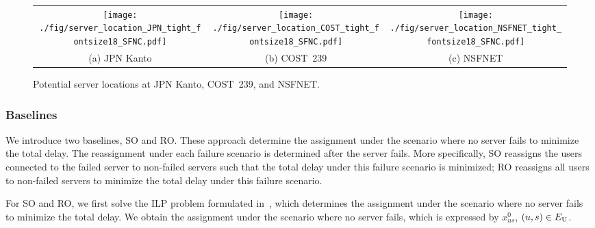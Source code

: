 \documentclass[10pt, letterpaper]{IEEEtran}
\begin{document}
\begin{CJK}{UTF8}{ipxm}
\begin{figure*}[!t]
  \begin{center}
      \begin{tabular}{ccc}
      \texttt{[image: ./fig/server\_location\_JPN\_tight\_fontsize18\_SFNC.pdf]} &
      \texttt{[image: ./fig/server\_location\_COST\_tight\_fontsize18\_SFNC.pdf]} &
      \texttt{[image: ./fig/server\_location\_NSFNET\_tight\_fontsize18\_SFNC.pdf]} \\
      (a) JPN Kanto & (b) COST~239 & (c) NSFNET
      \end{tabular}
  \end{center}
  \caption{Potential server locations at JPN Kanto, COST~239, and NSFNET.}
  \label{fig:ServerLocation}
\end{figure*}

\subsubsection{Baselines}
We introduce two baselines, SO and RO.
These approach determine the assignment under the scenario where no server fails to minimize the total delay.
The reassignment under each failure scenario is determined after the server fails.
More specifically, SO reassigns the users connected to the failed server to non-failed servers such that the total delay under this failure scenario is minimized;
RO reassigns all users to non-failed servers to minimize the total delay under this failure scenario.

For SO and RO, we first solve the ILP problem formulated in~\cite{2Kawabata2017}, which determines the assignment under the scenario where no server fails to minimize the total delay.
We obtain the assignment under the scenario where no server fails, which is expressed by $x^0_{us}$, $(u,s) \in E_{\rm{U}}$.



\end{CJK}
\end{document}
